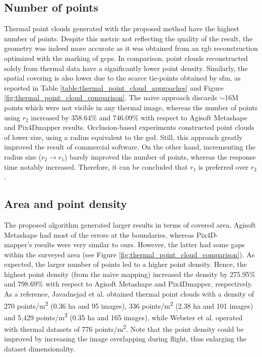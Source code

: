 \subsection{Number of points} 

Thermal point clouds generated with the proposed method have the highest number of points. Despite this metric not reflecting the quality of the result, the geometry was indeed more accurate as it was obtained from an \acrshort{rgb} reconstruction optimized with the marking of \acrshort{gcp}s. In comparison, point clouds reconstructed solely from thermal data have a significantly lower point density. Similarly, the spatial covering is also lower due to the scarce tie-points obtained by \acrshort{sfm}, as reported in Table \ref{table:thermal_point_cloud_approaches} and Figure \ref{fig:thermal_point_cloud_comparison}. The naive approach discards $\sim$16M points which were not visible in any thermal image, whereas the number of points using $r_2$ increased by 358.64\% and 746.09\% with respect to Agisoft Metashape and Pix4Dmapper results. Occlusion-based experiments constructed point clouds of lower size, using a radius equivalent to the \acrshort{gsd}. Still, this approach greatly improved the result of commercial software. On the other hand, incrementing the radius size ($r_2 \rightarrow r_1$) barely improved the number of points, whereas the response time notably increased. Therefore, it can be concluded that $r_1$ is preferred over $r_2$.

\subsection{Area and point density}

The proposed algorithm generated larger results in terms of covered area. Agisoft Metashape had most of the errors at the boundaries, whereas Pix4D-\\mapper's results were very similar to ours. However, the latter had some gaps within the surveyed area (see Figure \ref{fig:thermal_point_cloud_comparison}). As expected, the larger number of points led to a higher point density. Hence, the highest point density (from the naive mapping) increased the density by 275.95\% and 798.69\% with respect to Agisoft Metashape and Pix4Dmapper, respectively. As a reference, Javadnejad et al. \cite{javadnejad_photogrammetric_2020} obtained thermal point clouds with a density of 270 points/\si{\meter\squared} (0.36 \si{\hectare} and 95 images), 336 points/\si{\meter\squared} (2.38 \si{\hectare} and 101 images) and 5,429 points/\si{\meter\squared} (0.35 \si{\hectare} and 165 images), while Webster et al. \cite{webster_three-dimensional_2018} operated with thermal datasets of 776 points/\si{\meter\squared}. Note that the point density could be improved by increasing the image overlapping during flight, thus enlarging the dataset dimensionality.

